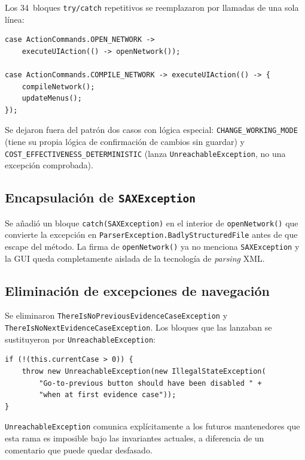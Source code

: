 \documentclass[12pt,a4paper]{article}
\begin{document}
Los 34~bloques \texttt{try/catch} repetitivos se reemplazaron por llamadas
de una sola línea:

\begin{lstlisting}[caption={Uso del patrón \texttt{UIAction} en \texttt{actionPerformed}}]
case ActionCommands.OPEN_NETWORK ->
    executeUIAction(() -> openNetwork());

case ActionCommands.COMPILE_NETWORK -> executeUIAction(() -> {
    compileNetwork();
    updateMenus();
});
\end{lstlisting}

Se dejaron fuera del patrón dos casos con lógica especial:
\texttt{CHANGE\_WORKING\_MODE} (tiene su propia lógica de confirmación de cambios
sin guardar) y \texttt{COST\_EFFECTIVENESS\_DETERMINISTIC} (lanza
\texttt{UnreachableException}, no una excepción comprobada).

\subsection{Encapsulación de \texttt{SAXException}}
\label{sec:impl-sax}

Se añadió un bloque \texttt{catch(SAXException)} en el interior de
\texttt{openNetwork()} que convierte la excepción en
\texttt{ParserException.BadlyStructuredFile} antes de que escape del método.
La firma de \texttt{openNetwork()} ya no menciona \texttt{SAXException} y la
GUI queda completamente aislada de la tecnología de \textit{parsing} XML.

\subsection{Eliminación de excepciones de navegación}
\label{sec:impl-nav}

Se eliminaron \texttt{ThereIsNoPreviousEvidenceCaseException} y
\texttt{ThereIsNoNextEvidenceCaseException}. Los bloques que las lanzaban se
sustituyeron por \texttt{UnreachableException}:

\begin{lstlisting}[caption={Guarda con \texttt{UnreachableException} en
  \texttt{goToPreviousEvidenceCase}}]
if (!(this.currentCase > 0)) {
    throw new UnreachableException(new IllegalStateException(
        "Go-to-previous button should have been disabled " +
        "when at first evidence case"));
}
\end{lstlisting}

\texttt{UnreachableException} comunica explícitamente a los futuros
mantenedores que esta rama es imposible bajo las invariantes actuales, a
diferencia de un comentario que puede quedar desfasado.
\end{document}
